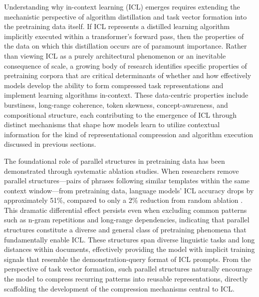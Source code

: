 \documentclass[11pt]{article}
\begin{document}
Understanding why in-context learning (ICL) emerges requires extending the mechanistic perspective of algorithm distillation and task vector formation into the pretraining data itself. If ICL represents a distilled learning algorithm implicitly executed within a transformer's forward pass, then the properties of the data on which this distillation occurs are of paramount importance. Rather than viewing ICL as a purely architectural phenomenon or an inevitable consequence of scale, a growing body of research identifies specific properties of pretraining corpora that are critical determinants of whether and how effectively models develop the ability to form compressed task representations and implement learning algorithms in-context. These data-centric properties include burstiness, long-range coherence, token skewness, concept-awareness, and compositional structure, each contributing to the emergence of ICL through distinct mechanisms that shape how models learn to utilize contextual information for the kind of representational compression and algorithm execution discussed in previous sections.

The foundational role of parallel structures in pretraining data has been demonstrated through systematic ablation studies. When researchers remove parallel structures---pairs of phrases following similar templates within the same context window---from pretraining data, language models' ICL accuracy drops by approximately 51\%, compared to only a 2\% reduction from random ablation \cite{ref67}. This dramatic differential effect persists even when excluding common patterns such as n-gram repetitions and long-range dependencies, indicating that parallel structures constitute a diverse and general class of pretraining phenomena that fundamentally enable ICL. These structures span diverse linguistic tasks and long distances within documents, effectively providing the model with implicit training signals that resemble the demonstration-query format of ICL prompts. From the perspective of task vector formation, such parallel structures naturally encourage the model to compress recurring patterns into reusable representations, directly scaffolding the development of the compression mechanisms central to ICL.
\end{document}
